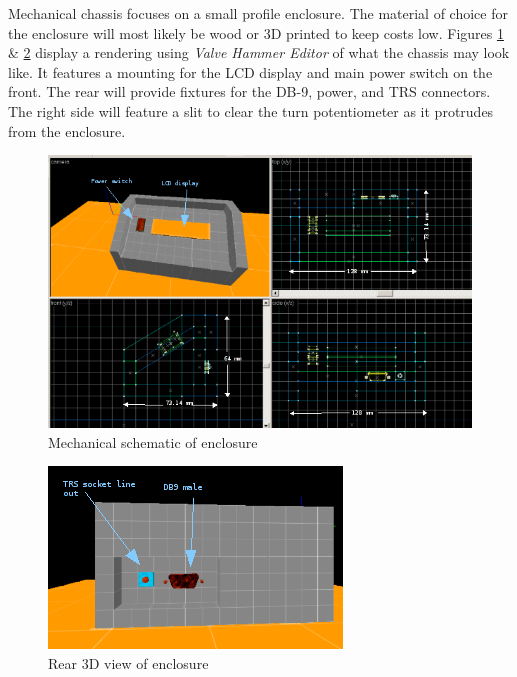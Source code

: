 \documentclass[bibtotocnumbered,abstract=on,paper=a4,fontsize=12pt,parskip=on,halfparskip=on]{scrartcl}		%
\begin{document}
\begin{enumerate}
      Mechanical chassis focuses on a small profile enclosure. The material of choice for the enclosure will most likely be wood or 3D printed to keep costs low. Figures \ref{fig:3d1} \&  \ref{fig:3d2} display a rendering using \textit{Valve Hammer Editor} of what the chassis may look like. It features a mounting for the LCD display and main power switch on the front. The rear will provide fixtures for the DB-9, power, and TRS connectors. The right side will feature a slit to clear the turn potentiometer as it protrudes from the enclosure.
    \end{enumerate}

      \begin{figure}[h]
        \centering
          \includegraphics[width=\linewidth]{img/fig_mechanical0}
          \caption{Mechanical schematic of enclosure}
          \label{fig:3d1}
      \end{figure}
      \begin{figure}[h]
        \centering
          \includegraphics[width=\linewidth]{img/fig_mechanical1}
          \caption{Rear 3D view of enclosure}
          \label{fig:3d2}
      \end{figure}
      \clearpage
\end{document}
